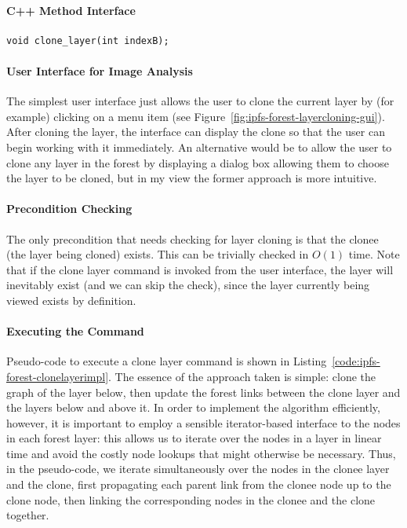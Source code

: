 \paragraph{C++ Method Interface}

\begin{lstlisting}[style=Prototype]
void clone_layer(int indexB);
\end{lstlisting}

\paragraph{User Interface for Image Analysis}

The simplest user interface just allows the user to clone the current layer by (for example) clicking on a menu item (see Figure~\ref{fig:ipfs-forest-layercloning-gui}). After cloning the layer, the interface can display the clone so that the user can begin working with it immediately. An alternative would be to allow the user to clone any layer in the forest by displaying a dialog box allowing them to choose the layer to be cloned, but in my view the former approach is more intuitive.


\paragraph{Precondition Checking}

The only precondition that needs checking for layer cloning is that the clonee (the layer being cloned) exists. This can be trivially checked in $O(1)$ time. Note that if the clone layer command is invoked from the user interface, the layer will inevitably exist (and we can skip the check), since the layer currently being viewed exists by definition.

\paragraph{Executing the Command}

Pseudo-code to execute a clone layer command is shown in Listing~\ref{code:ipfs-forest-clonelayerimpl}. The essence of the approach taken is simple: clone the graph of the layer below, then update the forest links between the clone layer and the layers below and above it. In order to implement the algorithm efficiently, however, it is important to employ a sensible iterator-based interface to the nodes in each forest layer: this allows us to iterate over the nodes in a layer in linear time and avoid the costly node lookups that might otherwise be necessary. Thus, in the pseudo-code, we iterate simultaneously over the nodes in the clonee layer and the clone, first propagating each parent link from the clonee node up to the clone node, then linking the corresponding nodes in the clonee and the clone together.

